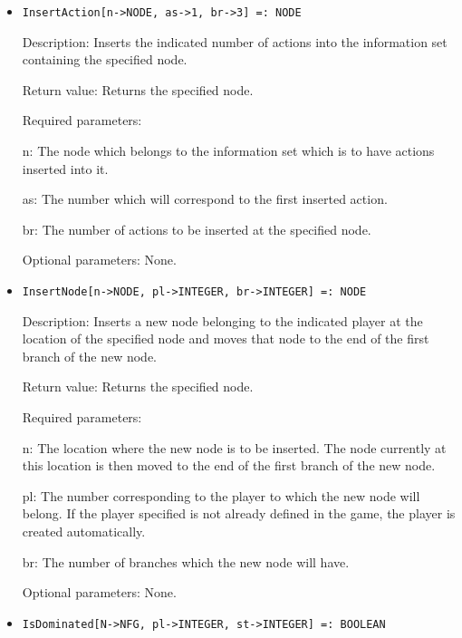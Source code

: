 \begin{itemize}
\item
\protect \large \begin{verbatim}
InsertAction[n->NODE, as->1, br->3] =: NODE
\end{verbatim}\normalsize

\bd
\item
[Description:] Inserts the indicated number of actions into the
information set containing the specified node.
\item
[Return value:] Returns the specified node.
\item
[Required parameters:]\hfil\null

\bd
\item
[n:] The node which belongs to the information set which is to have
actions inserted into it.
\item
[as:] The number which will correspond to the first inserted action.
\item
[br:] The number of actions to be inserted at the specified node.
\ed

\item
[Optional parameters:] None.
\ed

\item
\protect \large \begin{verbatim}
InsertNode[n->NODE, pl->INTEGER, br->INTEGER] =: NODE
\end{verbatim}\normalsize

\bd
\item
[Description:] Inserts a new node belonging to the indicated player at
the location of the specified node and moves that node to the end of
the first branch of the new node.
\item
[Return value:] Returns the specified node.
\item
[Required parameters:]\hfil\null

\bd
\item
[n:] The location where the new node is to be inserted.  The node
currently at this location is then moved to the end of the first
branch of the new node.
\item
[pl:] The number corresponding to the player to which the new node
will belong.  If the player specified is not already defined in	the
game, the player is created automatically.
\item
[br:] The number of branches which the new node will have.
\ed

\item
[Optional parameters:] None.
\ed

\item
\protect \large \begin{verbatim}
IsDominated[N->NFG, pl->INTEGER, st->INTEGER] =: BOOLEAN
\end{verbatim}\normalsize


\end{itemize}
